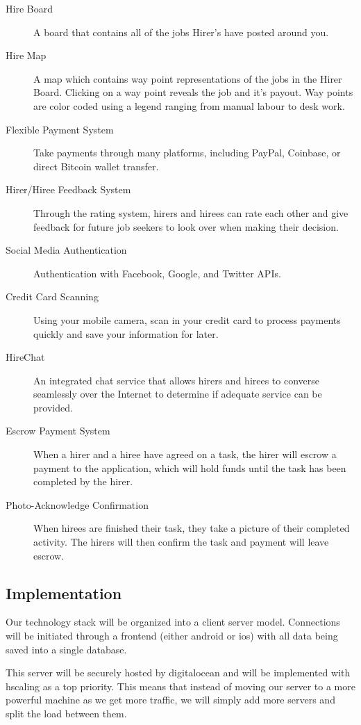 \documentclass[11pt]{article}
\begin{document}
\begin{description}
	\item[Hire Board] A board that contains all of the jobs Hirer's have posted around you.
	\item[Hire Map] A map which contains way point representations of the jobs in the Hirer Board. Clicking on a way point reveals the job and it's payout. Way points are color coded using a legend ranging from manual labour to desk work.
	\item[Flexible Payment System] Take payments through many platforms, including PayPal, Coinbase, or direct Bitcoin wallet transfer.
	\item[Hirer/Hiree Feedback System] Through the rating system, hirers and hirees can rate each other and give feedback for future job seekers to look over when making their decision.
	\item[Social Media Authentication] Authentication with Facebook, Google, and Twitter APIs.
	\item[Credit Card Scanning] Using your mobile camera, scan in your credit card to process payments quickly and save your information for later.
	\item[HireChat] An integrated chat service that allows hirers and hirees to converse seamlessly over the Internet to determine if adequate service can be provided.
	\item[Escrow Payment System] When a hirer and a hiree have agreed on a task, the hirer will escrow a payment to the application, which will hold funds until the task has been completed by the hirer.
	\item[Photo-Acknowledge Confirmation] When hirees are finished their task, they take a picture of their completed activity. The hirers will then confirm the task and payment will leave escrow.
\end{description}

\subsection{Implementation}

Our technology stack will be organized into a \gls{client} \gls{server} model. Connections will be initiated through a \gls{frontend} (either \gls{android} or \gls{ios}) with all data being saved into a single \gls{database}. 

This \gls{server} will be securely hosted by \gls{digitalocean} and will be implemented with \gls{hscaling} as a top priority. This means that instead of moving our \gls{server} to a more powerful machine as we get more traffic, we will simply add more \glspl{server} and split the load between them.
\end{document}
